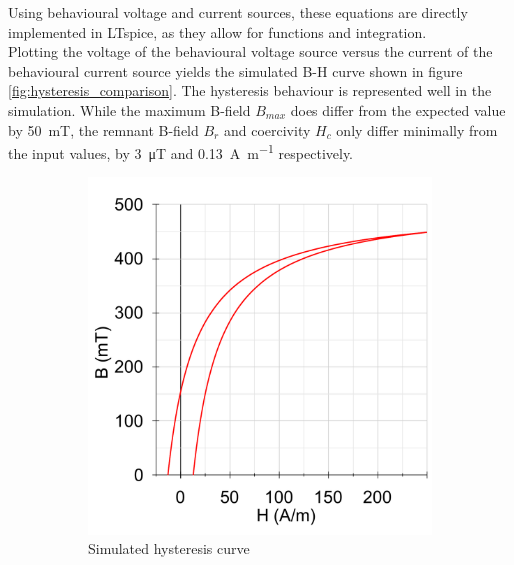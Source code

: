 Using behavioural voltage and current sources, these equations are directly implemented in LTspice, as they allow for functions and integration.\\

Plotting the voltage of the behavioural voltage source versus the current of the behavioural current source yields the simulated B-H curve shown in figure \ref{fig:hysteresis_comparison}. The hysteresis behaviour is represented well in the simulation. While the maximum B-field $B_{max}$ does differ from the expected value by \SI{50}{\milli\tesla}, the remnant B-field $B_r$ and coercivity $H_c$ only differ minimally from the input values, by \SI{3}{\micro\tesla} and \SI{0.13}{\A\per\m} respectively.
\begin{figure}[H]
    \begin{subfigure}[b]{0.50\textwidth}
        \includegraphics[width=\textwidth]{Bilder/Kapitel3/Hysteresis_LTspice_2.pdf}
        \caption{Simulated hysteresis curve}
    \end{subfigure}
    \begin{subfigure}[b]{0.49\textwidth}

\end{subfigure}
\end{figure}
